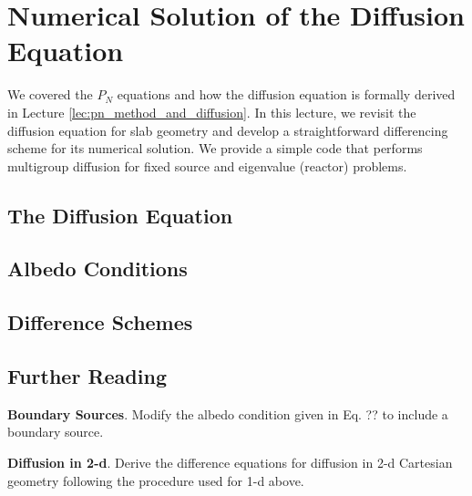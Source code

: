 
\chapter{Numerical Solution of the Diffusion Equation}
\label{app:diffusion}

We covered the $P_N$ equations and how the diffusion equation is formally derived in Lecture \ref{lec:pn_method_and_diffusion}.  In this lecture, we revisit the diffusion equation for slab geometry and develop a straightforward differencing scheme for its numerical solution.  We provide a simple code that performs multigroup diffusion for fixed source and eigenvalue (reactor) problems.

\section*{The Diffusion Equation}

\section*{Albedo Conditions}

\section*{Difference Schemes}

\section*{Further Reading}



\begin{exercises}

  \item \textbf{Boundary Sources}.  Modify the albedo condition given in Eq. ?? to include a boundary source. 

  \item \textbf{Diffusion in 2-d}.  Derive the difference equations for diffusion in 2-d Cartesian geometry following the procedure used for 1-d above.

\end{exercises}
